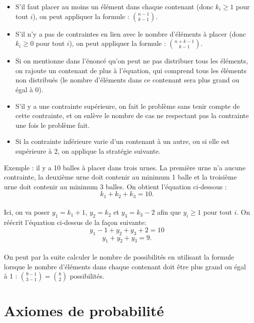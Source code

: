 \documentclass[10pt, french]{article}
\begin{document}
\begin{multicols*}{2}
\begin{definitionNOHFILLsub}
\begin{itemize}
\item S'il faut placer au moins un élément dans chaque contenant (donc $k_i \geq 1$ pour tout $i$), on peut appliquer la formule : $\binom{n-1}{k-1}$. 
\item S'il n'y a pas de contraintes en lien avec le nombre d'éléments à placer (donc $k_i \geq 0$ pour tout $i$), on peut appliquer la formule : $\binom{n+k-1}{k-1}$.
\item Si on mentionne dans l'énoncé qu'on peut ne pas distribuer tous les éléments, on rajoute un contenant de plus à l'équation, qui comprend tous les éléments non distribués (le nombre d'éléments dans ce contenant sera plus grand ou égal à 0).
\item S'il y a une contrainte supérieure, on fait le problème sans tenir compte de cette contrainte, et on enlève le nombre de cas ne respectant pas la contrainte une fois le problème fait.
\item Si la contrainte inférieure varie d'un contenant à un autre, ou si elle est supérieure à 2, on applique la stratégie suivante.
\end{itemize}

Exemple : il y a 10 balles à placer dans trois urnes. La première urne n'a aucune contrainte, la deuxième urne doit contenir au minimum 1 balle et la troisième urne doit contenir au minimum 3 balles. On obtient l'équation ci-dessous : \\
$$k_1+k_2+k_3 = 10.$$ \\
Ici, on va poser $y_1 = k_1 + 1$, $y_2 = k_2$ et $y_3 = k_3 - 2$ afin que $y_i \geq 1$ pour tout $i$. On réécrit l'équation ci-dessus de la façon suivante: \\ $$y_1 - 1 + y_2+ y_3 + 2 = 10$$ 
$$y_1 + y_2+ y_3 = 9.$$\\ On peut par la suite calculer le nombre de possibilités en utilisant la formule lorsque le nombre d'éléments dans chaque contenant doit être plus grand ou égal à 1 : $\binom{9-1}{3-1} = \binom{8}{2}$ possibilités.

\end{definitionNOHFILLsub}


\pagebreak
\section{Axiomes de probabilité}

\end{multicols*}
\end{document}
